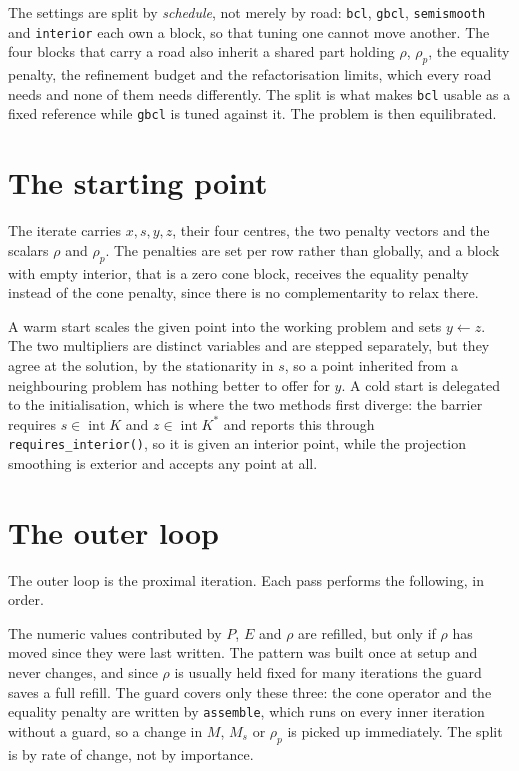 \documentclass[a4paper,11pt]{book}
\theoremstyle{plain}
\theoremstyle{definition}
\theoremstyle{remark}
\numberwithin{equation}{chapter}
\numberwithin{algorithm}{chapter}
\newcommand{\intr}{\operatorname{int}}
\begin{document}
	The settings are split by \emph{schedule}, not merely by road: \texttt{bcl},
	\texttt{gbcl}, \texttt{semismooth} and \texttt{interior} each own a block, so
	that tuning one cannot move another. The four blocks that carry a road also
	inherit a shared part holding $\rho$, $\rho_p$, the equality penalty, the
	refinement budget and the refactorisation limits, which every road needs and
	none of them needs differently. The split is what makes \texttt{bcl} usable as
	a fixed reference while \texttt{gbcl} is tuned against it.
	The problem is then equilibrated.



	\section{The starting point}

	The iterate carries $x,s,y,z$, their four centres, the two penalty vectors and
	the scalars $\rho$ and $\rho_p$. The penalties are set per row rather than
	globally, and a block with empty interior, that is a zero cone block, receives
	the equality penalty instead of the cone penalty, since there is no
	complementarity to relax there.

	A warm start scales the given point into the working problem and sets
	$y\gets z$. The two multipliers are distinct variables and are stepped
	separately, but they agree at the solution, by the stationarity in $s$, so a
	point inherited from a neighbouring problem has nothing better to offer for
	$y$. A cold start is delegated to the initialisation, which is where the two
	methods first diverge: the barrier requires
	$s\in\intr K$ and $z\in\intr K^*$ and reports this through
	\texttt{requires\_interior()}, so it is given an interior point, while the
	projection smoothing is exterior and accepts any point at all.

	\section{The outer loop}

	The outer loop is the proximal iteration. Each pass performs the following, in
	order.

	The numeric values contributed by $P$, $E$ and $\rho$ are refilled, but only
	if $\rho$ has moved since they were last written. The pattern was built once
	at setup and never changes, and since $\rho$ is usually held fixed for many
	iterations the guard saves a full refill. The guard covers only these three:
	the cone operator and the equality penalty are written by
	\texttt{assemble}, which runs on every inner iteration without a guard, so a
	change in $M$, $M_s$ or $\rho_p$ is picked up immediately. The split is by
	rate of change, not by importance.
\end{document}
